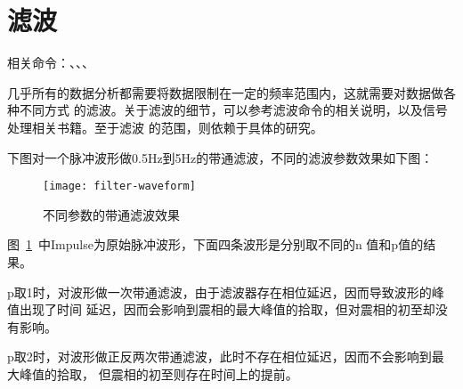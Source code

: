 \section{滤波}
相关命令：、、、

几乎所有的数据分析都需要将数据限制在一定的频率范围内，这就需要对数据做各种不同方式
的滤波。关于滤波的细节，可以参考滤波命令的相关说明，以及信号处理相关书籍。至于滤波
的范围，则依赖于具体的研究。

下图对一个脉冲波形做0.5Hz到5Hz的带通滤波，不同的滤波参数效果如下图：
\begin{figure}[H]
\centering
\texttt{[image: filter-waveform]}
\caption{不同参数的带通滤波效果}
\label{fig:filter-waveform}
\end{figure}
图~\ref{fig:filter-waveform}~中Impulse为原始脉冲波形，下面四条波形是分别取不同的n
值和p值的结果。

p取1时，对波形做一次带通滤波，由于滤波器存在相位延迟，因而导致波形的峰值出现了时间
延迟，因而会影响到震相的最大峰值的拾取，但对震相的初至却没有影响。

p取2时，对波形做正反两次带通滤波，此时不存在相位延迟，因而不会影响到最大峰值的拾取，
但震相的初至则存在时间上的提前。
